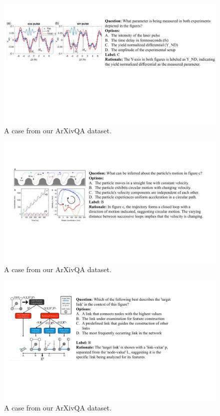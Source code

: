 \begin{figure}[tbh!]
    \centering
    \includegraphics[width=0.85\linewidth]{figs/arxivqa_case1.pdf}
    \caption{A case from our ArXivQA dataset.}
    \label{fig:qa_case_1}
\end{figure}



\begin{figure}[tbh!]
    \centering
    \includegraphics[width=0.85\linewidth]{figs/arxivqa_case2.pdf}
    \caption{A case from our ArXivQA dataset.}
    \label{fig:qa_case_2}
\end{figure}



\begin{figure}[tbh!]
    \centering
    \includegraphics[width=0.85\linewidth]{figs/arxivqa_case3.pdf}
    \caption{A case from our ArXivQA dataset.}
    \label{fig:qa_case_3}
\end{figure}



